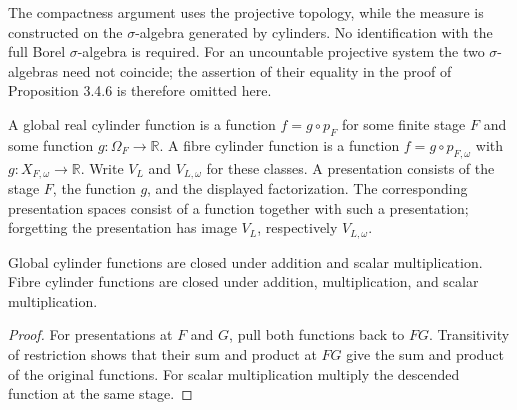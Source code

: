 \begin{remark}\label{rem:cylinder-borel-distinction}
The compactness argument uses the projective topology, while the measure
is constructed on the $\sigma$-algebra generated by cylinders. No
identification with the full Borel $\sigma$-algebra is required. For an
uncountable projective system the two $\sigma$-algebras need not coincide;
the assertion of their equality in the proof of Proposition 3.4.6 is
therefore omitted here.
\end{remark}

\begin{definition}\label{def:algebraic-cylinders}
\leanok
{}
A global real cylinder function is a function $f=g\circ p_F$ for some
finite stage $F$ and some function $g:\Omega_F\to\mathbb R$.
A fibre cylinder function is a function $f=g\circ p_{F,\omega}$ with
$g:X_{F,\omega}\to\mathbb R$. Write $V_L$ and $V_{L,\omega}$ for these
classes. A presentation consists of the stage $F$, the function $g$, and
the displayed factorization. The corresponding presentation spaces consist
of a function together with such a presentation; forgetting the presentation
has image $V_L$, respectively $V_{L,\omega}$.
\end{definition}

\begin{lemma}\label{lem:cylinder-algebra}
\leanok
{}
Global cylinder functions are closed under addition and scalar
multiplication. Fibre cylinder functions are closed under addition,
multiplication, and scalar multiplication.
\end{lemma}
\begin{proof}
For presentations at $F$ and $G$, pull both functions back to $FG$.
Transitivity of restriction shows that their sum and product at $FG$
give the sum and product of the original functions. For scalar
multiplication multiply the descended function at the same stage.
\end{proof}

